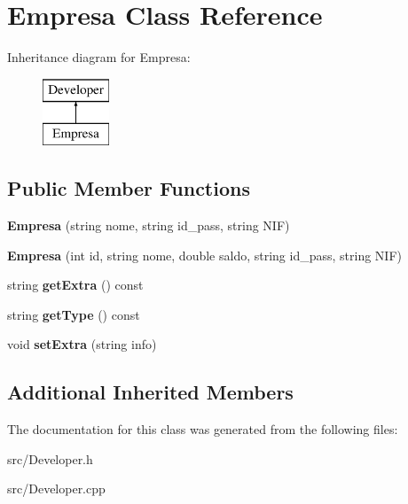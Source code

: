 \hypertarget{class_empresa}{\section{Empresa Class Reference}
\label{class_empresa}
}
Inheritance diagram for Empresa\+:\begin{figure}[H]
\begin{center}
\leavevmode
\includegraphics[height=2.000000cm]{class_empresa}
\end{center}
\end{figure}
\subsection*{Public Member Functions}
\begin{DoxyCompactItemize}
\item 
\hypertarget{class_empresa_a340762d9313904da4b41b722ea63935e}{{\bfseries Empresa} (string nome, string id\+\_\+pass, string N\+I\+F)}\label{class_empresa_a340762d9313904da4b41b722ea63935e}

\item 
\hypertarget{class_empresa_acc6cc9b9831e31ede97e4505e0446280}{{\bfseries Empresa} (int id, string nome, double saldo, string id\+\_\+pass, string N\+I\+F)}\label{class_empresa_acc6cc9b9831e31ede97e4505e0446280}

\item 
\hypertarget{class_empresa_ac0c678ba135778e8c62ba4944a68e925}{string {\bfseries get\+Extra} () const }\label{class_empresa_ac0c678ba135778e8c62ba4944a68e925}

\item 
\hypertarget{class_empresa_a85c63a96090672cbc2a572865ec20f44}{string {\bfseries get\+Type} () const }\label{class_empresa_a85c63a96090672cbc2a572865ec20f44}

\item 
\hypertarget{class_empresa_ad6923e466ff3289e0bfb2e777ef41ee9}{void {\bfseries set\+Extra} (string info)}\label{class_empresa_ad6923e466ff3289e0bfb2e777ef41ee9}

\end{DoxyCompactItemize}
\subsection*{Additional Inherited Members}


The documentation for this class was generated from the following files\+:\begin{DoxyCompactItemize}
\item 
src/Developer.\+h\item 
src/Developer.\+cpp\end{DoxyCompactItemize}
